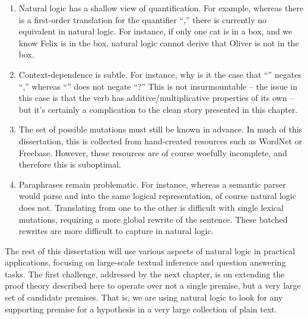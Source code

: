 \begin{enumerate}
\item Natural logic has a shallow view of quantification. For example, whereas there is a first-order translation for
      the quantifier ``,'' there is currently no equivalent in natural logic.
      For instance, if only one cat is in a box, and we know Felix is in the box, natural logic cannot derive
      that Oliver is not in the box.
\item Context-dependence is subtle. For instance, why is it the case that ``''
      negates ``,'' whereas ``'' does not
      negate ``?''
      This is not insurmountable -- the issue in this case is that the verb  has additive/multiplicative
      properties of its own -- but it's certainly a complication to the clean story presented in this chapter.
\item The set of possible mutations must still be known in advance. In much of this dissertation, this is collected
      from hand-created resources such as WordNet or Freebase. However, these resources are of course woefully
      incomplete, and therefore this is suboptimal.
\item Paraphrases remain problematic. For instance, whereas a semantic parser would parse 
      and  into the same logical representation, of course natural logic does not.
      Translating from one to the other is difficult with single lexical mutations, requiring a more global
      rewrite of the sentence.
      These batched rewrites are more difficult to capture in natural logic.
\end{enumerate}


The rest of this dissertation will use various aspects of natural logic in practical applications,
  focusing on large-scale textual inference and question answering tasks.
The first challenge, addressed by the next chapter, is on extending the proof theory described
  here to operate over not a single premise, but a very large set of candidate premises.
That is, we are using natural logic to look for any supporting premise for a hypothesis 
  in a very large collection of plain text.
